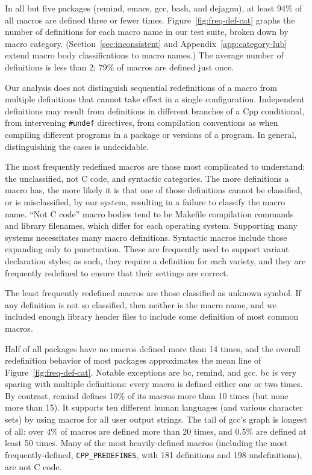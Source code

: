 \documentclass[10pt]{article}
\newcommand{\pkg}[1]{\textsf{#1}}
\begin{document}
In all but five packages (\pkg{remind}, \pkg{emacs}, \pkg{gcc}, \pkg{bash},
and \pkg{dejagnu}), at least 94\% of all macros are defined three or fewer
times.  Figure~\ref{fig:freq-def-cat} graphs the number of definitions for
each macro name in our test suite, broken down by macro category.
(Section~\ref{sec:inconsistent} and Appendix~\ref{app:category-lub} extend
macro body classifications to macro names.)  The average number of
definitions is less than 2; 79\% of macros are defined just once.

Our analysis does not distinguish sequential redefinitions of a macro from
multiple definitions that cannot take effect in a single configuration.
Independent definitions may result from definitions in different branches
of a Cpp conditional, from intervening {\tt \#undef} directives, from
compilation conventions as when compiling different programs in a package
or versions of a program.  In general, distinguishing the cases is
undecidable.

The most frequently redefined macros are those most complicated to
understand: the unclassified, not C code, and syntactic categories.  The
more definitions a macro has, the more likely it is that one of those
definitions cannot be classified, or is misclassified, by our system,
resulting in a failure to classify the macro name.  ``Not C code'' macro
bodies tend to be Makefile compilation commands and library filenames,
which differ for each operating system.  Supporting many systems
necessitates many macro definitions.  Syntactic macros include those
expanding only to punctuation.  These are frequently used to support
variant declaration styles; as such, they require a definition for each
variety, and they are frequently redefined to ensure that their settings
are correct.


The least frequently redefined macros are those classified as unknown
symbol.  If any definition is not so classified, then neither is the
macro name, and we included enough library header files to include some
definition of most common macros.

Half of all packages have no macros defined more than 14 times, and the
overall redefinition behavior of most packages approximates the mean line
of Figure~\ref{fig:freq-def-cat}.  Notable exceptions are \pkg{bc},
\pkg{remind}, and \pkg{gcc}.  \pkg{bc} is very sparing with multiple
definitions: every macro is defined either one or two times.  By contrast, 
\pkg{remind} defines 10\% of its macros more than 10 times (but none more
than 15).  It supports ten different human languages (and various character
sets) by using macros for all user output strings.  The tail of \pkg{gcc}'s
graph is longest of all: over 4\% of macros are defined more than 20 times,
and 0.5\% are defined at least 50 times.  Many of the most heavily-defined
macros (including the most frequently-defined, \verb|CPP_PREDEFINES|, with
181 definitions and 198 undefinitions), are not C code.
\end{document}
